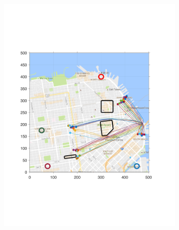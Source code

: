 \begin{figure}[!htb]
\begin{subfigure}{\columnwidth}
  \includegraphics[width=\columnwidth]{figs/sf_d6sep0_s3}
  \subcaption{}
  \label{fig:sf_d6sep0_s3}
\end{subfigure}%
\begin{subfigure}{\columnwidth}

\end{subfigure}
\end{figure}
